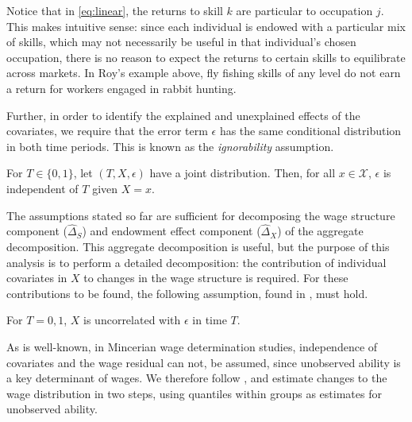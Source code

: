 Notice that in \eqref{eq:linear}, the returns to skill $k$ are particular to occupation $j$. This makes intuitive sense: since each individual is endowed with a particular mix of skills, which may not necessarily be useful in that individual's chosen occupation, there is no reason to expect the returns to certain skills to equilibrate across markets. In Roy's example above, fly fishing skills of any level do not earn a return for workers engaged in rabbit hunting.

Further, in order to identify the explained and unexplained effects of the covariates, we require that the error term $\epsilon$ has the same conditional distribution in both time periods. This is known as the {\em ignorability} assumption.
\begin{assumption}[Ignorability]
  For $T\in\{0,1\}$, let $(T, X, \epsilon)$ have a joint distribution. Then, for all $x\in \mathcal{X}$, $\epsilon$ is independent of $T$ given $X=x$.
\end{assumption}

The assumptions stated so far are sufficient for decomposing the wage structure component ($\hat{\Delta}_S$) and endowment effect component ($\hat{\Delta}_X$) of the aggregate decomposition. This aggregate decomposition is useful, but the purpose of this analysis is to perform a detailed decomposition: the contribution of individual covariates in $X$ to changes in the wage structure is required. For these contributions to be found, the following assumption, found in \citet{Matzkin2003}, must hold.
\begin{assumption}[Independence]
  For $T=0,1$, $X$ is uncorrelated with $\epsilon$ in time $T$.
\end{assumption}
As is well-known, in Mincerian wage determination studies, independence of covariates and the wage residual can not, be assumed, since unobserved ability is a key determinant of wages. We therefore follow \citet{Juhn1993}, and estimate changes to the wage distribution in two steps, using quantiles within groups as estimates for unobserved ability.



